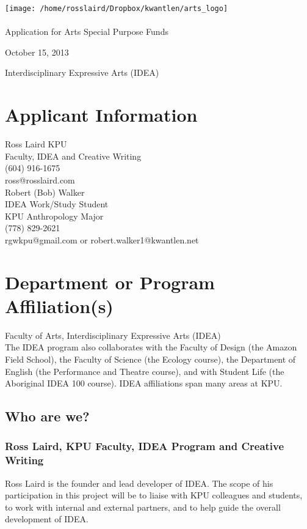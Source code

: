 \documentclass[11pt, letterpaper]{article}
\begin{document}
    \thispagestyle{empty}
    \reversemarginpar
    \noindent
    \texttt{[image: /home/rosslaird/Dropbox/kwantlen/arts\_logo]}\\[2em]
      \\[2em]

{\LARGE Application for Arts Special Purpose Funds}

October 15, 2013

Interdisciplinary Expressive Arts (IDEA)

\section{Applicant Information}

Ross Laird KPU \\
Faculty, IDEA and Creative Writing\\
(604) 916-1675\\
ross@rosslaird.com\\[1em]
\noindent
Robert (Bob) Walker\\
IDEA Work/Study Student\\
KPU Anthropology Major\\
(778) 829-2621\\
rgwkpu@gmail.com or robert.walker1@kwantlen.net

\section{Department or Program Affiliation(s)}

Faculty of Arts, Interdisciplinary Expressive Arts (IDEA)\\[1em]
\noindent
The IDEA program also collaborates with the Faculty of Design (the
Amazon Field School), the Faculty of Science (the Ecology course), the
Department of English (the Performance and Theatre course), and with
Student Life (the Aboriginal IDEA 100 course). IDEA affiliations span many areas at KPU.

\subsection{Who are we?}

\subsubsection{Ross Laird, KPU Faculty, IDEA Program and Creative Writing}

Ross Laird is the founder and lead developer of IDEA. The scope of his
participation in this project will be to liaise with KPU colleagues and
students, to work with internal and external partners, and to help guide
the overall development of IDEA.
\end{document}
